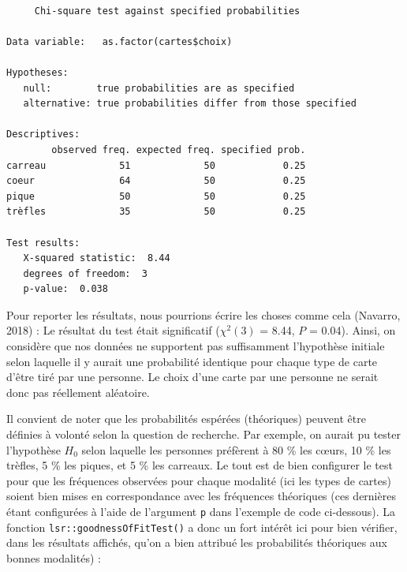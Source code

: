 \documentclass[
  letterpaper,
]{book}
\newenvironment{Shaded}{\begin{snugshade}}{\end{snugshade}}
\newcommand{\AttributeTok}[1]{\textcolor[rgb]{0.40,0.45,0.13}{#1}}
\newcommand{\FloatTok}[1]{\textcolor[rgb]{0.68,0.00,0.00}{#1}}
\newcommand{\FunctionTok}[1]{\textcolor[rgb]{0.28,0.35,0.67}{#1}}
\newcommand{\NormalTok}[1]{\textcolor[rgb]{0.00,0.23,0.31}{#1}}
\newcommand{\SpecialCharTok}[1]{\textcolor[rgb]{0.37,0.37,0.37}{#1}}
\begin{document}
\begin{verbatim}

     Chi-square test against specified probabilities

Data variable:   as.factor(cartes$choix) 

Hypotheses: 
   null:        true probabilities are as specified
   alternative: true probabilities differ from those specified

Descriptives: 
        observed freq. expected freq. specified prob.
carreau             51             50            0.25
coeur               64             50            0.25
pique               50             50            0.25
trèfles             35             50            0.25

Test results: 
   X-squared statistic:  8.44 
   degrees of freedom:  3 
   p-value:  0.038 
\end{verbatim}

Pour reporter les résultats, nous pourrions écrire les choses comme cela
(Navarro, 2018) : Le résultat du test était significatif (\(\chi^2(3)\)
= 8.44, \(P\) = 0.04). Ainsi, on considère que nos données ne supportent
pas suffisamment l'hypothèse initiale selon laquelle il y aurait une
probabilité identique pour chaque type de carte d'être tiré par une
personne. Le choix d'une carte par une personne ne serait donc pas
réellement aléatoire.

Il convient de noter que les probabilités espérées (théoriques) peuvent
être définies à volonté selon la question de recherche. Par exemple, on
aurait pu tester l'hypothèse \(H_{0}\) selon laquelle les personnes
préfèrent à 80 \% les cœurs, 10 \% les trèfles, 5 \% les piques, et 5 \%
les carreaux. Le tout est de bien configurer le test pour que les
fréquences observées pour chaque modalité (ici les types de cartes)
soient bien mises en correspondance avec les fréquences théoriques (ces
dernières étant configurées à l'aide de l'argument \texttt{p} dans
l'exemple de code ci-dessous). La fonction
\texttt{lsr::goodnessOfFitTest()} a donc un fort intérêt ici pour bien
vérifier, dans les résultats affichés, qu'on a bien attribué les
probabilités théoriques aux bonnes modalités) :

\begin{Shaded}
\end{Shaded}
\end{document}
